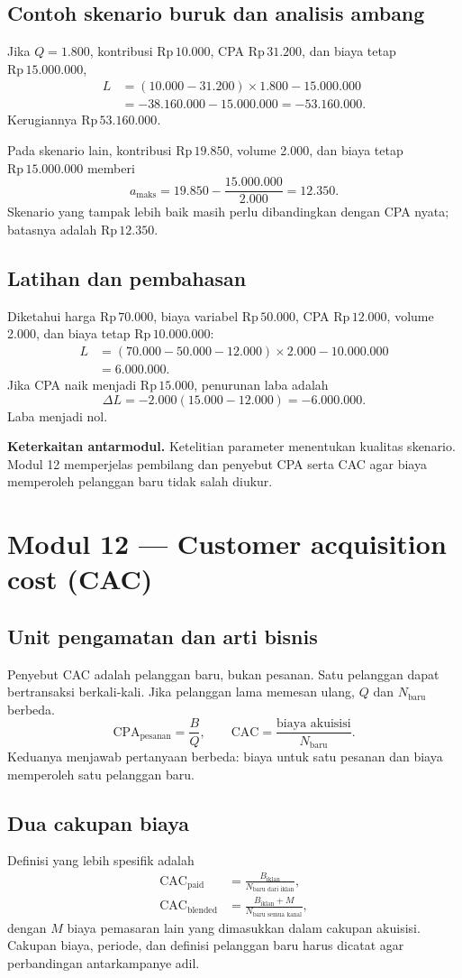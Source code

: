 \documentclass[11pt,a4paper]{article}
\newcommand{\modul}[2]{\clearpage\section{Modul #1 --- #2}}
\newcommand{\bagian}[1]{\Needspace{5\baselineskip}\subsection{#1}}
\newcommand{\jembatan}[1]{\par\textbf{Keterkaitan antarmodul.} #1\par}
\newcommand{\CPA}{\mathrm{CPA}}
\newcommand{\CAC}{\mathrm{CAC}}
\newcommand{\rp}[1]{\ensuremath{\mathrm{Rp}\,#1}}
\begin{document}
\bagian{Contoh skenario buruk dan analisis ambang}
Jika \(Q=1.800\), kontribusi \rp{10.000}, CPA \rp{31.200}, dan biaya tetap \rp{15.000.000},
\[
\begin{aligned}
L&=(10.000-31.200)\times1.800-15.000.000\\
&=-38.160.000-15.000.000=-53.160.000.
\end{aligned}
\]
Kerugiannya \rp{53.160.000}.

Pada skenario lain, kontribusi \rp{19.850}, volume 2.000, dan biaya tetap \rp{15.000.000} memberi
\[
a_{\text{maks}}=19.850-\frac{15.000.000}{2.000}=12.350.
\]
Skenario yang tampak lebih baik masih perlu dibandingkan dengan CPA nyata; batasnya adalah \rp{12.350}.

\bagian{Latihan dan pembahasan}
Diketahui harga \rp{70.000}, biaya variabel \rp{50.000}, CPA \rp{12.000}, volume 2.000, dan biaya tetap \rp{10.000.000}:
\[
\begin{aligned}
L&=(70.000-50.000-12.000)\times2.000-10.000.000\\
&=6.000.000.
\end{aligned}
\]
Jika CPA naik menjadi \rp{15.000}, penurunan laba adalah
\[
\Delta L=-2.000(15.000-12.000)=-6.000.000.
\]
Laba menjadi nol.
\jembatan{Ketelitian parameter menentukan kualitas skenario. Modul 12 memperjelas pembilang dan penyebut CPA serta CAC agar biaya memperoleh pelanggan baru tidak salah diukur.}

\modul{12}{Customer acquisition cost (CAC)}
\bagian{Unit pengamatan dan arti bisnis}
Penyebut CAC adalah pelanggan baru, bukan pesanan. Satu pelanggan dapat bertransaksi berkali-kali. Jika pelanggan lama memesan ulang, \(Q\) dan \(N_{\text{baru}}\) berbeda.
\[
\CPA_{\text{pesanan}}=\frac{B}{Q},\qquad
\CAC=\frac{\text{biaya akuisisi}}{N_{\text{baru}}}.
\]
Keduanya menjawab pertanyaan berbeda: biaya untuk satu pesanan dan biaya memperoleh satu pelanggan baru.

\bagian{Dua cakupan biaya}
Definisi yang lebih spesifik adalah
\[
\begin{aligned}
\CAC_{\text{paid}}&=\frac{B_{\text{iklan}}}{N_{\text{baru dari iklan}}},\\
\CAC_{\text{blended}}&=
\frac{B_{\text{iklan}}+M}{N_{\text{baru semua kanal}}},
\end{aligned}
\]
dengan \(M\) biaya pemasaran lain yang dimasukkan dalam cakupan akuisisi. Cakupan biaya, periode, dan definisi pelanggan baru harus dicatat agar perbandingan antarkampanye adil.
\end{document}

